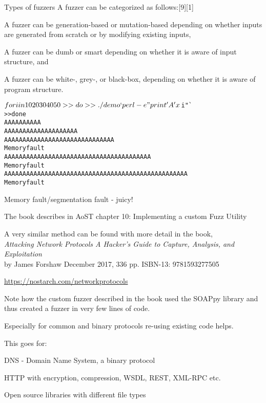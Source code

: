 \documentclass[Screen16to9,17pt]{foils}
\begin{document}
Types of fuzzers
A fuzzer can be categorized as follows:[9][1]
\begin{list2}
\item A fuzzer can be generation-based or mutation-based depending on whether inputs are generated from scratch or by modifying existing inputs,
\item A fuzzer can be dumb or smart depending on whether it is aware of input structure, and
\item A fuzzer can be white-, grey-, or black-box, depending on whether it is aware of program structure.
\end{list2}



\begin{alltt}
$ for i in 10 20 30 40 50
>> do
>> ./demo `perl -e "print 'A'x$i"`
>> done
AAAAAAAAAA
AAAAAAAAAAAAAAAAAAAA
AAAAAAAAAAAAAAAAAAAAAAAAAAAAAA
Memory fault
AAAAAAAAAAAAAAAAAAAAAAAAAAAAAAAAAAAAAAAA
Memory fault
AAAAAAAAAAAAAAAAAAAAAAAAAAAAAAAAAAAAAAAAAAAAAAAAAA
Memory fault
\end{alltt}

\centerline{Memory fault/segmentation fault - juicy!}




The book describes in AoST chapter 10: Implementing a custom Fuzz Utility

A very similar method can be found with more detail in the book,\\
\emph{Attacking Network Protocols A Hacker's Guide to Capture, Analysis, and Exploitation}\\
by James Forshaw December 2017, 336 pp. ISBN-13: 9781593277505

\url{https://nostarch.com/networkprotocols}


Note how the custom fuzzer described in the book used the SOAPpy library and thus created a fuzzer in very few lines of code.

Especially for common and binary protocols re-using existing code helps.

This goes for:
\begin{list2}
\item DNS - Domain Name System, a binary protocol
\item HTTP with encryption, compression, WSDL, REST, XML-RPC etc.
\item Open source libraries with different file types
\end{list2}
\end{document}

